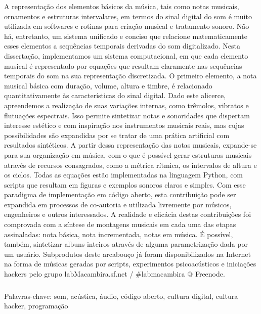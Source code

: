 \begin{resumo}

A representação dos elementos básicos da música, tais como notas musicais, ornamentos e estruturas intervalares, em termos do sinal digital do som é muito utilizada em softwares e rotinas para criação musical e tratamento sonoro. Não há, entretanto, um sistema unificado e conciso que relacione matematicamente esses elementos a sequências temporais derivadas do som digitalizado. Nesta dissertação, implementamos um sistema computacional, em que cada elemento musical é representado por equações que resultam claramente nas sequências temporais do som na sua representação discretizada. O primeiro elemento, a nota musical básica com duração, volume, altura e timbre, é relacionado quantitativamente às características do sinal digital. Dado este alicerce, apreendemos a realização de suas variações internas, como trêmolos, vibratos e flutuações espectrais. Isso permite sintetizar notas e sonoridades que dispertam interesse estético e com inspiração nos instrumentos musicais reais, mas cujas possibilidades são expandidas por se tratar de uma prática artificial com resultados sintéticos. A partir dessa representação das notas musicais, expande-se para sua organização em música, com o que é possível gerar estruturas musicais através de recursos consagrados, como a métrica rítmica, os intervalos de altura e os ciclos. Todas as equações estão implementadas na linguagem Python, com scripts que resultam em figuras e exemplos sonoros claros e simples. Com esse paradigma de implementação em código aberto, esta contribuição pode ser expandida em processos de co-autoria e utilizada livremente por músicos, engenheiros e outros interessados. A realidade e eficácia destas contribuições foi comprovada com a síntese de montagens musicais em cada uma das etapas assinaladas: nota básica, nota incrementada, notas em música. É possível, também, sintetizar albuns inteiros através de alguma parametrização dada por um usuário. Subprodutos deste arcabouço já foram disponibilizados na Internet na forma de músicas geradas por scripts, experimentos psicoacústicos e iniciações hackers pelo grupo labMacambira.sf.net / \#labmacambira @ Freenode.




$\phantom{linha em branco}$\\
Palavras-chave: som, acústica, áudio, código aberto, cultura digital, cultura hacker, programação

\end{resumo}

